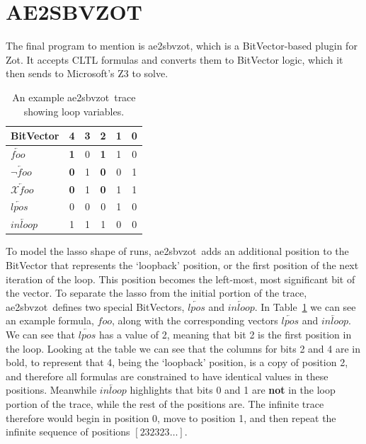 \documentclass[a4paper,11pt]{report}
\theoremstyle{definition}
\newcommand{\aez}{ae2sbvzot}
\begin{document}
\section{AE2SBVZOT}\label{zot-encoding}

The final program to mention is \aez, which is a BitVector-based plugin for Zot.
It accepts CLTL formulas and converts them to BitVector logic, which it then
sends to Microsoft's Z3 to solve.

\begin{table}[hb]
  \centering
  \caption{An example \aez\ trace showing loop variables.}
  \begin{tabular}{l|c c c c c}
    BitVector & \textbf{4} & 3 & \textbf{2} & 1 & 0 \\
    \midrule
    \(\overleftarrow{foo}\)            & \textbf{1} & 0 & \textbf{1} & 1 & 0 \\
    \(\overleftarrow{\neg foo}\)       & \textbf{0} & 1 & \textbf{0} & 0 & 1 \\
    \(\overleftarrow{\mathcal{X}foo}\) & \textbf{0} & 1 & \textbf{0} & 1 & 1 \\

    \midrule
    \(\overleftarrow{lpos}\)           & 0 & 0 & 0 & 1 & 0 \\
    \(\overleftarrow{inloop}\)         & 1 & 1 & 1 & 0 & 0

  \end{tabular}
  \label{table:zotloop}
 \end{table}

To model the lasso shape of runs, \aez\ adds an additional position to the
BitVector that represents the `loopback' position, or the first position of the
next iteration of the loop. This position becomes the left-most, most
significant bit of the vector. To separate the lasso from the initial portion of
the trace, \aez\ defines two special BitVectors, \(\overleftarrow{lpos}\) and
\(\overleftarrow{inloop}\). In Table~\ref{table:zotloop} we can see an example formula,
\(foo\), along with the corresponding vectors \(\overleftarrow{lpos}\) and
\(\overleftarrow{inloop}\). We can see that \(\overleftarrow{lpos}\) has a value
of 2, meaning that bit 2 is the first position in the loop. Looking at the table
we can see that the columns for bits 2 and 4 are in bold, to represent that 4,
being the `loopback' position, is a copy of position 2, and therefore all
formulas are constrained to have identical values in these positions. Meanwhile
\(\overleftarrow{inloop}\) highlights that bits 0 and 1 are \textbf{not} in the
loop portion of the trace, while the rest of the positions are. The infinite
trace therefore would begin in position 0, move to position 1, and then repeat
the infinite sequence of positions \([232323\ldots]\).
\end{document}
